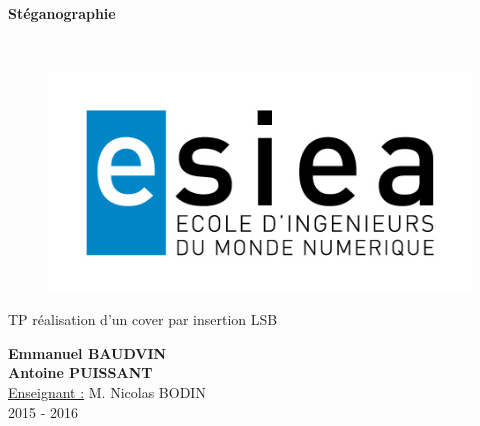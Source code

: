 \begin{titlepage}
      \begin{center}   
        \Huge
        \textbf{Stéganographie}
        
        \LARGE
        ~
        
        
        \vfill
        \begin{figure}[H]
	    \centering
	    \begin{minipage}{0.9\textwidth}
		\centering
		\includegraphics[width=\textwidth]{./img/esiea.jpeg}
	    \end{minipage}
	\end{figure}
        \vfill
        
        \vspace{0.5cm}
        
        TP réalisation d'un cover par insertion LSB
        
        \vspace{2cm}
        \textbf{Emmanuel BAUDVIN\\Antoine PUISSANT}\\
        \vspace{0.8cm}
        \Large
        \underline{Enseignant :} M. Nicolas BODIN\\
        \vspace{0.5cm}
        2015 - 2016%
        
    \end{center}
\end{titlepage}